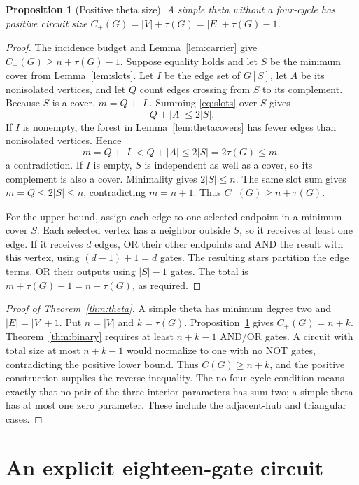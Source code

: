 \documentclass[11pt]{article}
\newtheorem{proposition}[theorem]{Proposition}
\theoremstyle{definition}
\theoremstyle{remark}
\begin{document}
\begin{proposition}[Positive theta size]\label{prop:positive}
A simple theta without a four-cycle has positive circuit size
$C_+(G)=|V|+\tau(G)=|E|+\tau(G)-1$.
\end{proposition}
\begin{proof}
The incidence budget and Lemma~\ref{lem:carrier} give
$C_+(G)\ge n+\tau(G)-1$. Suppose equality holds and let $S$ be the minimum
cover from Lemma~\ref{lem:slots}. Let $I$ be the edge set of $G[S]$, let
$A$ be its nonisolated vertices, and let $Q$ count edges crossing from $S$
to its complement. Because $S$ is a cover, $m=Q+|I|$. Summing
\eqref{eq:slots} over $S$ gives
\[
                         Q+|A|\le2|S|.
\]
If $I$ is nonempty, the forest in Lemma~\ref{lem:thetacovers} has fewer
edges than nonisolated vertices. Hence
\[
 m=Q+|I|<Q+|A|\le2|S|=2\tau(G)\le m,
\]
a contradiction. If $I$ is empty, $S$ is independent as well as a cover,
so its complement is also a cover. Minimality gives $2|S|\le n$.
The same slot sum gives $m=Q\le2|S|\le n$, contradicting $m=n+1$.
Thus $C_+(G)\ge n+\tau(G)$.

For the upper bound, assign each edge to one selected endpoint in a minimum
cover $S$. Each selected vertex has a neighbor outside $S$, so it receives
at least one edge. If it receives $d$ edges, OR their other endpoints and
AND the result with this vertex, using $(d-1)+1=d$ gates. The resulting
stars partition the edge terms. OR their outputs using $|S|-1$ gates.
The total is $m+\tau(G)-1=n+\tau(G)$, as required.
\end{proof}

\begin{proof}[Proof of Theorem~\ref{thm:theta}]
A simple theta has minimum degree two and $|E|=|V|+1$. Put $n=|V|$ and
$k=\tau(G)$. Proposition~\ref{prop:positive} gives $C_+(G)=n+k$.
Theorem~\ref{thm:binary} requires at least $n+k-1$ AND/OR gates.
A circuit with total size at most $n+k-1$ would normalize to one with no
NOT gates, contradicting the positive lower bound. Thus $C(G)\ge n+k$,
and the positive construction supplies the reverse inequality.
The no-four-cycle condition means exactly that no pair of the three
interior parameters has sum two; a simple theta has at most one zero
parameter. These include the adjacent-hub and triangular cases.
\end{proof}

\section{An explicit eighteen-gate circuit}
\end{document}

